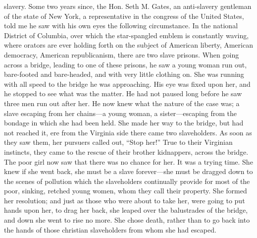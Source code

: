 slavery. Some two years since, the Hon. Seth M. Gates, an anti-slavery
gentleman of the state of New York, a representative in the congress of
the United States, told me he saw with his own eyes the following
circumstance. In the national {\protect\hypertarget{413}{}{}}District of
Columbia, over which the star-spangled emblem is constantly waving,
where orators are ever holding forth on the subject of American liberty,
American democracy, American republicanism, there are two slave prisons.
When going across a bridge, leading to one of these prisons, he saw a
young woman run out, bare-footed and bare-headed, and with very little
clothing on. She was running with all speed to the bridge he was
approaching. His eye was fixed upon her, and he stopped to see what was
the matter. He had not paused long before he saw three men run out after
her. He now knew what the nature of the case was; a slave escaping from
her chains---a young woman, a sister---escaping from the bondage in
which she had been held. She made her way to the bridge, but had not
reached it, ere from the Virginia side there came two slaveholders. As
soon as they saw them, her pursuers called out, ``Stop her!'' True to
their Virginian instincts, they came to the rescue of their brother
kidnappers, across the bridge. The poor girl now saw that there was no
chance for her. It was a trying time. She knew if she went back, she
must be a slave forever---she must be dragged down to the scenes of
pollution which the slaveholders continually provide for most of the
poor, sinking, retched young women, whom they call their property. She
formed her resolution; and just as those who were about to take her,
were going to put hands upon her, to drag her back, she leaped over the
balustrades of the bridge, and down she went to rise no more. She chose
death, rather than to go back into the hands of those christian
slaveholders from whom she had escaped.

